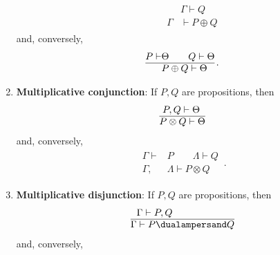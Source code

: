 \begin{enumerate}
\begin{gather}
                \qquad
                \begin{aligned}
                    &\Gamma\vdash Q\\
                    \hline
                    \Gamma&\vdash P\oplus Q
                \end{aligned}
            \end{gather}
            and, conversely,
            \begin{gather}
                \begin{aligned}
                    P\vdash&\Theta\qquad Q\vdash\Theta\\
                    \hline
                    &P\oplus Q\vdash\Theta
                \end{aligned}\,.
            \end{gather}
        \item\textbf{Multiplicative conjunction}: If $P,Q$ are propositions, then
            \begin{gather}
                \begin{aligned}
                    &\,\,P,Q\vdash\Theta\\
                    \hline
                    &P\otimes Q\vdash\Theta
                \end{aligned}
            \end{gather}
            and, conversely,
            \begin{gather}
                \begin{aligned}
                    \Gamma\vdash&P\qquad\Lambda\vdash Q\\
                    \hline
                    \Gamma,\,&\Lambda\vdash P\otimes Q
                \end{aligned}\,.
            \end{gather}
        \item\textbf{Multiplicative disjunction}: If $P,Q$ are propositions, then
            \begin{gather}
                \begin{aligned}
                    &\Gamma\vdash P,Q\\
                    \hline
                    \Gamma&\vdash P\dualampersand Q
                \end{aligned}
            \end{gather}
            and, conversely,
            \begin{gather}
                \begin{aligned}

\end{aligned}
\end{gather}
\end{enumerate}
